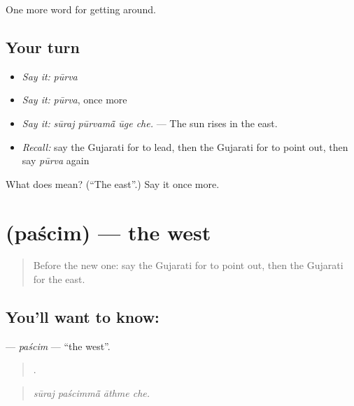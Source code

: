 \begin{grammarlens}[title={What you've built}]
One more word for getting around.
\end{grammarlens}

\subsection*{Your turn}
\begin{itemize}
\raggedright
  \item \emph{Say it:} \emph{pūrva}
  \item \emph{Say it:} \emph{pūrva}, once more
  \item \emph{Say it:} \emph{sūraj pūrvamā̃ ūge che.} — The sun rises in the east.
  \item \emph{Recall:} say the Gujarati for to lead, then the Gujarati for to point out, then say \emph{pūrva} again
\end{itemize}

\begin{tcolorbox}[breakable,colback=teal!4,colframe=teal!35!black,title={Before you move on}]
What does  mean? (\textquotedblleft{}The east\textquotedblright{}.) Say it once more.
\end{tcolorbox}
\section[\texorpdfstring{\gu{પશ્ચિમ} (paścim)}{પશ્ચિમ (paścim)}]{ (paścim) — the west}

\label{lesson:GU-C414-pascim}



\begin{quote}
Before the new one: say the Gujarati for to point out, then the Gujarati for the east.
\end{quote}

\subsection*{You'll want to know: }
\textbf{} — \emph{paścim} — \textquotedblleft{}the west\textquotedblright{}.

\begin{quote}
   .
\end{quote}

\begin{quote}
\emph{sūraj paścimmā̃ āthme che.}
\end{quote}

